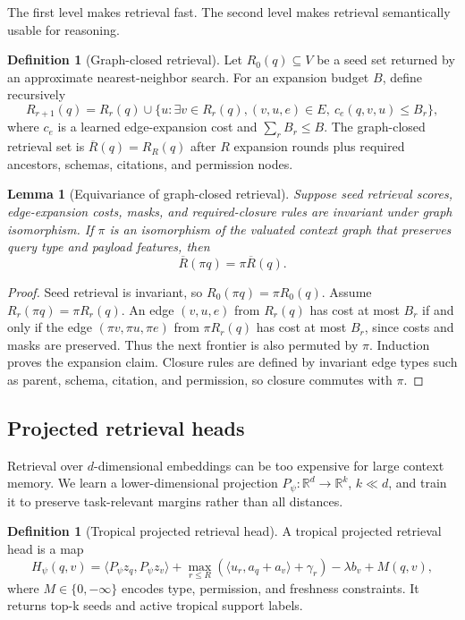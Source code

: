 \documentclass[11pt]{article}
\newtheorem{lemma}[theorem]{Lemma}
\theoremstyle{definition}
\newtheorem{definition}[theorem]{Definition}
\theoremstyle{remark}
\newcommand{\R}{\mathbb{R}}
\begin{document}
The first level makes retrieval fast. The second level makes retrieval semantically usable for reasoning.

\begin{definition}[Graph-closed retrieval]
Let \(R_0(q)\subseteq V\) be a seed set returned by an approximate nearest-neighbor search. For an expansion budget \(B\), define recursively
\[
    R_{r+1}(q)=R_r(q)\cup \{u: \exists v\in R_r(q), (v,u,e)\in E,\ c_e(q,v,u)\le B_r\},
\]
where \(c_e\) is a learned edge-expansion cost and \(\sum_r B_r\le B\). The graph-closed retrieval set is \(\overline R(q)=R_R(q)\) after \(R\) expansion rounds plus required ancestors, schemas, citations, and permission nodes.
\end{definition}

\begin{lemma}[Equivariance of graph-closed retrieval]
Suppose seed retrieval scores, edge-expansion costs, masks, and required-closure rules are invariant under graph isomorphism. If \(\pi\) is an isomorphism of the valuated context graph that preserves query type and payload features, then
\[
    \overline R(\pi q)=\pi \overline R(q).
\]
\end{lemma}
\begin{proof}
Seed retrieval is invariant, so \(R_0(\pi q)=\pi R_0(q)\). Assume \(R_r(\pi q)=\pi R_r(q)\). An edge \((v,u,e)\) from \(R_r(q)\) has cost at most \(B_r\) if and only if the edge \((\pi v,\pi u,\pi e)\) from \(\pi R_r(q)\) has cost at most \(B_r\), since costs and masks are preserved. Thus the next frontier is also permuted by \(\pi\). Induction proves the expansion claim. Closure rules are defined by invariant edge types such as parent, schema, citation, and permission, so closure commutes with \(\pi\).
\end{proof}

\subsection{Projected retrieval heads}

Retrieval over \(d\)-dimensional embeddings can be too expensive for large context memory. We learn a lower-dimensional projection \(P_\psi:\R^d\to\R^k\), \(k\ll d\), and train it to preserve task-relevant margins rather than all distances.

\begin{definition}[Tropical projected retrieval head]
A tropical projected retrieval head is a map
\[
    H_\psi(q,v)=\langle P_\psi z_q,P_\psi z_v\rangle + \max_{r\le R}(\langle u_r,a_q+a_v\rangle+\gamma_r)-\lambda b_v + M(q,v),
\]
where \(M\in\{0,-\infty\}\) encodes type, permission, and freshness constraints. It returns top-k seeds and active tropical support labels.
\end{definition}
\end{document}
